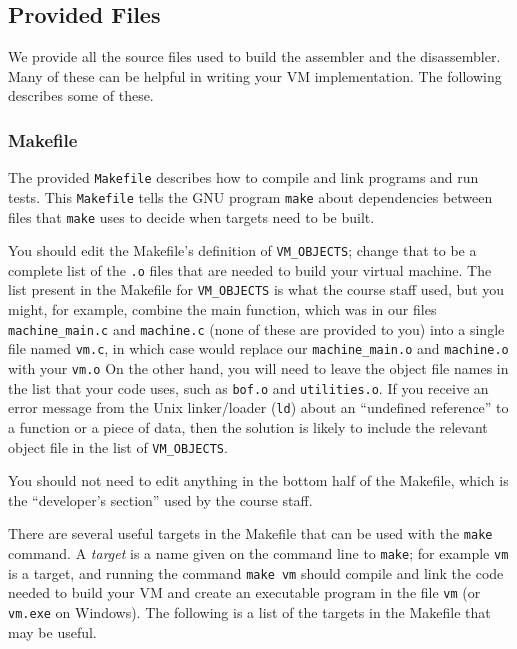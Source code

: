 \documentclass[11pt,letterpaper]{article}
\begin{document}
\subsection{Provided Files}

We provide all the source files used to build the assembler and the
disassembler. Many of these can be helpful in writing your VM
implementation. The following describes some of these.

\subsubsection{Makefile}

The provided \texttt{Makefile} describes how to compile and link programs
and run tests. This \texttt{Makefile} tells the GNU program
\texttt{make} \cite{GNUMake}
about dependencies between files that \texttt{make} uses
to decide when targets need to be built.

You should edit the Makefile's definition of \texttt{VM\_OBJECTS};
change that to be a complete list of the \texttt{.o} files
that are needed to build your virtual machine.
The list present in the Makefile for \texttt{VM\_OBJECTS} 
is what the course staff used,
but you might, for example, combine the main function,
which was in our files \texttt{machine\_main.c} and
\texttt{machine.c} (none of these are provided to you)
into a single file named \texttt{vm.c}, in which case would replace
our \texttt{machine\_main.o} and \texttt{machine.o} with your \texttt{vm.o}
On the other hand, you will need to leave the object file names in the
list that your code uses, such as \texttt{bof.o} and \texttt{utilities.o}.
If you receive an error message from the Unix linker/loader
(\texttt{ld}) about an ``undefined reference'' to a function or a
piece of data, then the solution is likely to include the relevant
object file in the list of \texttt{VM\_OBJECTS}.

You should not need to edit anything in the bottom half of the
Makefile, which is the ``developer's section'' used by the course staff.

There are several useful targets in the Makefile that can be used with
the \texttt{make} command. A \emph{target} is a name given on the
command line to \texttt{make}; for example \texttt{vm} is a target,
and running the command \texttt{make vm} should compile and link the
code needed to build your VM and create an executable program in the
file \texttt{vm} (or \texttt{vm.exe} on Windows).  The following is a
list of the targets in the Makefile that may be useful.
\end{document}
